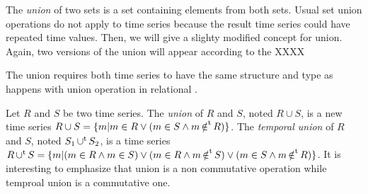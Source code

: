 The \emph{union} of two sets is a set containing elements from both
sets. Usual set union operations do not apply to time series because
the result time series could have repeated time values.  Then, we will
give a slighty modified concept for union.
Again, two versions of the union will appear according to the 
XXXX
%

The union requires both time series to have the same structure and
type as happens with union operation in relational 
\cite{date:introduction}.

%
Let $R$ and $S$ be two time series. 
%
The \emph{union} of $R$ and $S$, noted $R\cup S$, is a new time series
$R \cup S = \{m|m\in R\vee (m\in S\wedge m \operatorname*{\notin^t} R)\}$. 
%
The \emph{temporal union} of $R$ and $S$, noted $S_1 \operatorname*{\cup^t} S_2$, is a
time series $R \operatorname*{\cup^t} S = \{ m | (m \in R \wedge m \in S) \vee (m \in R
\wedge m \operatorname*{\notin^t} S) \vee (m \in S \wedge m \operatorname*{\notin^t} R) \}$.  
%
It is interesting to emphasize that union is a non commutative
operation while temproal union is a commutative one.

